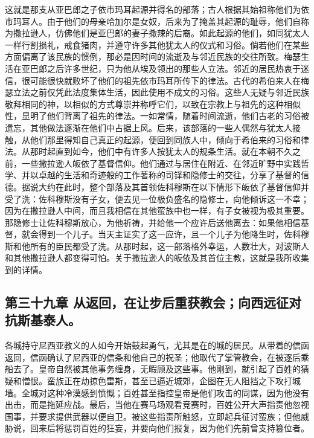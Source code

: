 这就是那支从亚巴郎之子依市玛耳起源并得名的部落；古人根据其始祖称他们为依市玛耳人。由于他们的母亲哈加尔是女奴，后来为了掩盖其起源的耻辱，他们自称为撒拉逊人，仿佛他们是亚巴郎的妻子撒辣的后裔。如此起源的他们，如同犹太人一样行割损礼，戒食猪肉，并遵守许多其他犹太人的仪式和习俗。倘若他们在某些方面偏离了该民族的惯例，那必是因时间的流逝及与邻近民族的交往所致。梅瑟生活在亚巴郎之后许多世纪，只为他从埃及领出的那些人立法。邻近的居民热衷于迷信，很可能很快就败坏了他们的祖先依市玛耳所传下的律法。古代的希伯来人在梅瑟立法之前仅凭此法度集体生活，因此使用不成文的习俗。这些人无疑与邻近民族敬拜相同的神，以相似的方式尊崇并称呼它们，以致在宗教上与祖先的这种相似性，显明了他们背离了祖先的律法。一如常情，随着时间流逝，他们古老的习俗被遗忘，其他做法逐渐在他们中占据上风。后来，该部落的一些人偶然与犹太人接触，从他们那里得知自己真正的起源，便回到同族人中，倾向于希伯来的习俗和律法。从那时起直到如今，他们中有许多人按犹太人的规条生活。就在本朝不久之前，一些撒拉逊人皈依了基督信仰。他们通过与居住在附近、在邻近旷野中实践哲学、并以卓越的生活和奇迹般的工作著称的司铎和隐修士的交往，分享了基督的信德。据说大约在此时，整个部落及其首领佐科穆斯在以下情形下皈依了基督信仰并受了洗：佐科穆斯没有子女，便去见一位极负盛名的隐修士，向他倾诉这一不幸；因为在撒拉逊人中间，而且我相信在其他蛮族中也一样，有子女被视为极其重要。那隐修士让佐科穆斯放心，为他祈祷，并给他一个应许后送他离去：如果他相信基督，就会得到一个儿子。当天主证实了这一应许，且一个儿子为他降生时，佐科穆斯和他所有的臣民都受了洗。从那时起，这一部落格外幸运，人数壮大，对波斯人和其他撒拉逊人都变得可怕。关于撒拉逊人的皈依及其首位主教，这就是我所收集到的详情。\par


\subsection{第三十九章 从返回，在让步后重获教会；向西远征对抗斯基泰人。}

各城持守尼西亚教义的人如今开始鼓起勇气，尤其是在的城的居民。从带着的信函返回，信函确认了尼西亚的信条和他自己的祝圣；他取代了掌管教会，在被逐后乘船去了。皇帝自然被其他事务缠身，无暇顾及这些事。他刚到，就引起了百姓的猜疑和憎恨。蛮族正在劫掠色雷斯，甚至已逼近城郊，企图在无人阻挡之下攻打城墙。全城对这种冷漠感到愤慨；百姓甚至指控皇帝是他们攻击的同谋，因为他没有出击，而是拖延应战。最后，当他在赛马场观看竞赛时，百姓公开大声指责他忽视国事，并要求提供武器以便自卫。被这些指责所触怒，立即起兵征讨蛮族；但他威胁说，回来后将惩罚百姓的狂妄，并要向他们报复，因为他们先前曾支持篡位者。\par

